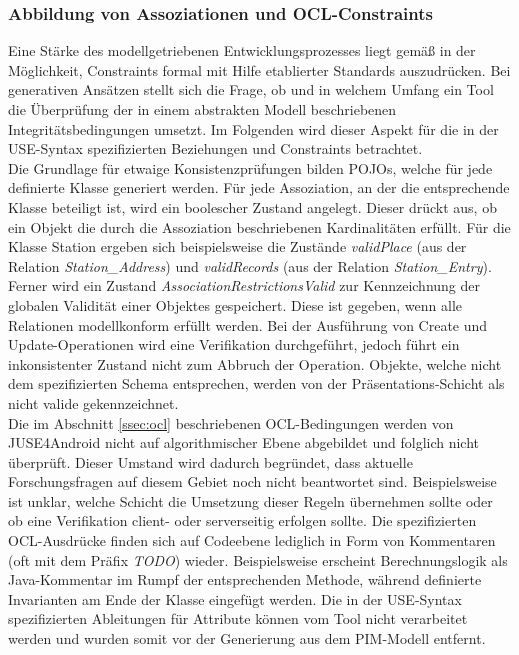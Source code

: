 \documentclass[a4paper,twoside]{article}
\begin{document}
\subsubsection{Abbildung von Assoziationen und OCL-Constraints}
Eine Stärke des modellgetriebenen Entwicklungsprozesses liegt gemäß \cite{SWOT} in der Möglichkeit, Constraints formal mit Hilfe etablierter Standards auszudrücken. Bei generativen Ansätzen stellt sich die Frage, ob und in welchem Umfang ein Tool die Überprüfung der in einem abstrakten Modell beschriebenen Integritätsbedingungen umsetzt. Im Folgenden wird dieser Aspekt für die in der USE-Syntax spezifizierten Beziehungen und Constraints betrachtet. 
\\

Die Grundlage für etwaige Konsistenzprüfungen bilden POJOs, welche für jede definierte Klasse generiert werden. Für jede Assoziation, an der die entsprechende Klasse beteiligt ist, wird ein boolescher Zustand angelegt. Dieser drückt aus, ob ein Objekt die durch die Assoziation beschriebenen Kardinalitäten erfüllt. Für die Klasse Station ergeben sich beispielsweise die Zustände \textit{validPlace} (aus der Relation \textit{Station\_Address}) und \textit{validRecords} (aus der Relation \textit{Station\_Entry}). Ferner wird ein Zustand \textit{AssociationRestrictionsValid} zur Kennzeichnung der globalen Validität einer Objektes gespeichert. Diese ist gegeben, wenn alle Relationen modellkonform erfüllt werden. Bei der Ausführung von Create und Update-Operationen wird eine Verifikation durchgeführt, jedoch führt ein inkonsistenter Zustand nicht zum Abbruch der Operation. Objekte, welche nicht dem spezifizierten Schema entsprechen, werden von der Präsentations-Schicht als nicht valide gekennzeichnet.
\\

Die im Abschnitt \ref{ssec:ocl} beschriebenen OCL-Bedingungen werden von JUSE4Android nicht auf algorithmischer Ebene abgebildet und folglich nicht überprüft. \cite[S.59]{SilvaMasterThesis} Dieser Umstand wird dadurch begründet, dass aktuelle Forschungsfragen auf diesem Gebiet noch nicht beantwortet sind. Beispielsweise ist unklar, welche Schicht die Umsetzung dieser Regeln übernehmen sollte oder ob eine Verifikation client- oder serverseitig erfolgen sollte. \cite[S.107]{SilvaMasterThesis} 
Die spezifizierten OCL-Ausdrücke finden sich auf Codeebene lediglich in Form von Kommentaren (oft mit dem Präfix \textit{TODO}) wieder. Beispielsweise erscheint Berechnungslogik als Java-Kommentar im Rumpf der entsprechenden Methode, während definierte Invarianten am Ende der Klasse eingefügt werden. Die in der USE-Syntax spezifizierten Ableitungen für Attribute können vom Tool nicht verarbeitet werden und wurden somit vor der Generierung aus dem PIM-Modell entfernt. 
\end{document}
